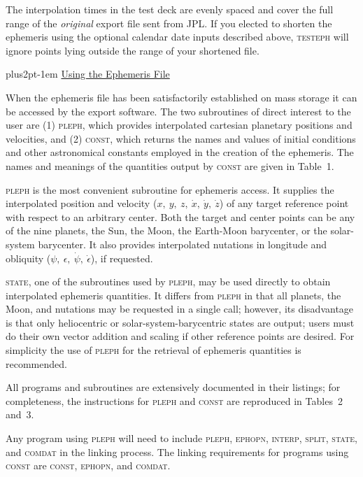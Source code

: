 \documentclass[twoside,11pt]{article}
\renewcommand{\_}{\texttt{\symbol{95}}}
\newcommand{\hdg}[1]{\vskip4pt plus2pt\leavevmode\kern-1em \underline{\large{#1}}\par}
\newcommand{\hdg}[1]{\subsection*{{#1}}}
\begin{document}
The interpolation times in the test deck are evenly spaced
and cover the full range of the {\it original\/} export file sent from JPL.
If you elected to shorten the ephemeris using the optional calendar
date inputs described above, \textsc{testeph}
will ignore points lying outside
the range of your shortened file.

\hdg{Using the Ephemeris File}

When the ephemeris file has been satisfactorily established
on mass storage it can be accessed by the export software.
The two subroutines of direct interest to the user are
(1) \textsc{pleph}, which provides interpolated
cartesian planetary positions and
velocities, and (2) \textsc{const}, which returns the
names and values of initial conditions and other astronomical
constants employed in the creation of the ephemeris. The
names and meanings of the quantities output by \textsc{const}
are given in Table~1.

\textsc{pleph} is the most convenient subroutine for ephemeris access.
It supplies the interpolated position and velocity ($x,\>y,\>z,
\>\dot x,\>\dot y,\>\dot z$)
of any target reference point with respect to an arbitrary center.
Both the target and center points can be any of the nine
planets, the Sun, the Moon, the Earth-Moon barycenter, or the
solar-system barycenter. It also provides interpolated nutations
in longitude and obliquity ($\psi,\>\epsilon,\>\dot\psi,
\>\dot\epsilon$), if requested.

\textsc{state}, one of the subroutines used by \textsc{pleph},
may be used directly to obtain interpolated ephemeris quantities.
It differs from \textsc{pleph} in that all planets, the Moon, and
nutations may be requested in a single call; however, its disadvantage
is that only heliocentric or solar-system-barycentric states are output;
users must do their own vector addition and scaling if other
reference points are desired. For simplicity the use of \textsc{pleph}
for the retrieval of ephemeris quantities is recommended.

All programs and subroutines are extensively documented in their
listings; for completeness, the instructions for \textsc{pleph}
and \textsc{const} are reproduced in Tables~2 and~3.

Any program using \textsc{pleph} will need to include
\textsc{pleph, ephopn, interp, split, state}, and \textsc{comdat}
in the linking process. The linking requirements for
programs using \textsc{const} are \textsc{const, ephopn}, and
\textsc{comdat}.
\end{document}
